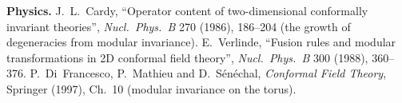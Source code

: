 \textbf{Physics.} J.~L.~Cardy, ``Operator content of two-dimensional conformally invariant theories'', \emph{Nucl.\ Phys.\ B} 270
(1986), 186--204 (the growth of degeneracies from modular invariance). E.~Verlinde, ``Fusion rules and modular transformations in
2D conformal field theory'', \emph{Nucl.\ Phys.\ B} 300 (1988), 360--376. P.~Di~Francesco, P.~Mathieu and D.~S\'en\'echal,
\emph{Conformal Field Theory}, Springer (1997), Ch.~10 (modular invariance on the torus).

\endgroup
